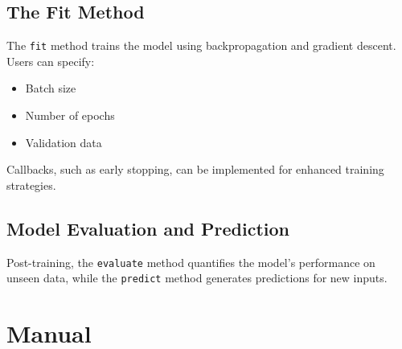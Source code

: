 	\subsection*{The Fit Method}
	The \texttt{fit} method trains the model using backpropagation and gradient descent. Users can specify:
	\begin{itemize}
		\item Batch size
		\item Number of epochs
		\item Validation data
	\end{itemize}
	Callbacks, such as early stopping, can be implemented for enhanced training strategies.
	
	\subsection*{Model Evaluation and Prediction}
	Post-training, the \texttt{evaluate} method quantifies the model’s performance on unseen data, while the \texttt{predict} method generates predictions for new inputs.\cite{Keras:2024}
	
\section*{Manual}
